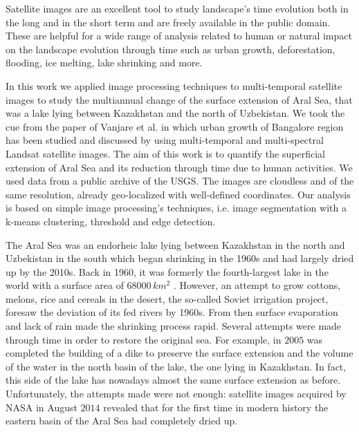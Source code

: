 Satellite images are an excellent tool to study landscape's time evolution both in the long and in the short term and are freely available in the public domain. 
These are helpful for a wide range of analysis related to human or natural impact on the landscape evolution through time such as urban growth, deforestation, flooding, ice melting, lake shrinking and more.

In this work we applied image processing techniques to multi-temporal satellite images to study the multiannual change of the surface extension of Aral Sea, that was a lake lying between Kazakhstan and the north of Uzbekistan. 
We took the cue from the paper of Vanjare et al. \cite{satelliteImg} in which urban growth of Bangalore region has been studied and discussed by using multi-temporal and multi-spectral Landsat satellite images. 
The aim of this work is to quantify the superficial extension of Aral Sea and its reduction through time due to human activities.
We used data from a public archive of the USGS. 
The images are cloudless and of the same resolution, already geo-localized with well-defined coordinates. 
Our analysis is based on simple image processing's techniques, i.e. image segmentation with a k-means clustering, threshold and edge detection.

The Aral Sea was an endorheic lake lying between Kazakhstan in the north and Uzbekistan in the south which began shrinking in the 1960s and had largely dried up by the 2010s. 
Back in 1960, it was formerly the fourth-largest lake in the world with a surface area of $68000\,km^2$ \cite{aralSea}.  
However, an attempt to grow cottons, melons, rice and cereals in the desert, the so-called Soviet irrigation project, foresaw the deviation of its fed rivers by 1960s. 
From then surface evaporation and lack of rain made the shrinking process rapid. Several attempts were made through time in order to restore the original sea.
For example, in $2005$ was completed the building of a dike to preserve the surface extension and the volume of the water in the north basin of the lake, the one lying in Kazakhstan. 
In fact, this side of the lake has nowadays almost the same surface extension as before. 
Unfortunately, the attempts made were not enough: satellite images acquired by NASA in August $2014$ revealed that for the first time in modern history the eastern basin of the Aral Sea had completely dried up.
